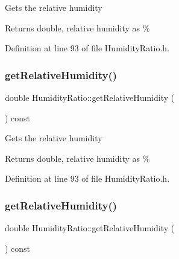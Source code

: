 Gets the relative humidity

\begin{DoxyReturn}{Returns}
double, relative humidity as \% 
\end{DoxyReturn}


Definition at line 93 of file Humidity\+Ratio.\+h.

\mbox{\label{class_humidity_ratio_af761b52e96bdf995e1a2bbbfd9e3b47f}} 
\subsubsection{\texorpdfstring{get\+Relative\+Humidity()}{getRelativeHumidity()}\hspace{0.1cm}{\footnotesize\ttfamily [2/3]}}
{\footnotesize\ttfamily double Humidity\+Ratio\+::get\+Relative\+Humidity (\begin{DoxyParamCaption}{ }\end{DoxyParamCaption}) const\hspace{0.3cm}{\ttfamily [inline]}}

Gets the relative humidity

\begin{DoxyReturn}{Returns}
double, relative humidity as \% 
\end{DoxyReturn}


Definition at line 93 of file Humidity\+Ratio.\+h.

\mbox{\label{class_humidity_ratio_af761b52e96bdf995e1a2bbbfd9e3b47f}} 
\subsubsection{\texorpdfstring{get\+Relative\+Humidity()}{getRelativeHumidity()}\hspace{0.1cm}{\footnotesize\ttfamily [3/3]}}
{\footnotesize\ttfamily double Humidity\+Ratio\+::get\+Relative\+Humidity (\begin{DoxyParamCaption}{ }\end{DoxyParamCaption}) const\hspace{0.3cm}{\ttfamily [inline]}}

